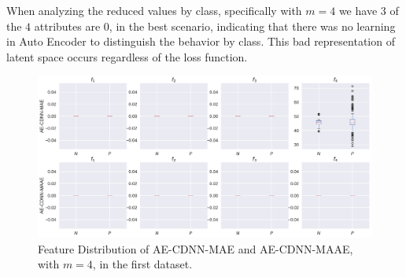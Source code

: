 \begin{table}[!ht]
\centering
{}
\caption{Accuracy in Classification, with loss MAAE, on each fold cross-validation, for Dataset 2.}
\label{table:acc-maae-chbmit-fold-2}
\end{table}

When analyzing the reduced values by class, specifically with $m = 4$ we have $3$ of the $4$ attributes are $0$, in the best scenario, indicating that there was no learning in Auto Encoder to distinguish the behavior by class. This bad representation of latent space occurs regardless of the loss function.


\begin{figure}[!ht]
\centering
\includegraphics[width=0.8\linewidth]{figure/feature_distribution_4.pdf}
    \caption{Feature Distribution of AE-CDNN-MAE and AE-CDNN-MAAE, with $m=4$, in the first dataset. }
\label{fig:feature_distribution_4}
\end{figure}

